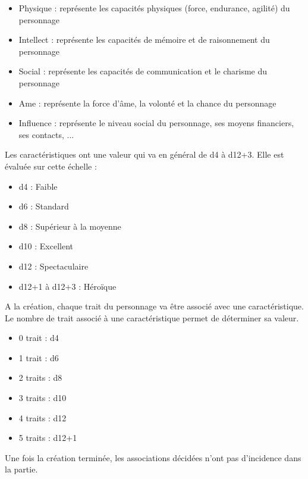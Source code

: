 \begin{multicols}{2}
\begin{itemize}
\item Physique : représente les capacités physiques (force, endurance, agilité) du personnage
\item Intellect : représente les capacités de mémoire et de raisonnement du personnage
\item Social : représente les capacités de communication et le charisme du personnage
\item Ame : représente la force d'âme, la volonté et la chance du personnage
\item Influence : représente le niveau social du personnage, ses moyens financiers, ses contacts, ...
\end{itemize}

Les caractéristiques ont une valeur qui va en général de d4 à d12+3. Elle est évaluée sur cette échelle :

\begin{itemize}
\item d4 : Faible
\item d6 : Standard
\item d8 : Supérieur à la moyenne
\item d10 : Excellent
\item d12 : Spectaculaire
\item d12+1 à d12+3 : Héroïque 
\end{itemize}

A la création, chaque trait du personnage va être associé avec une caractéristique. Le nombre de trait associé à une caractéristique permet de déterminer sa valeur.
 
\begin{itemize}
\item 0 trait : d4
\item 1 trait : d6
\item 2 traits : d8
\item 3 traits : d10
\item 4 traits : d12
\item 5 traits : d12+1
\end{itemize}

Une fois la création terminée, les associations décidées n'ont pas d'incidence dans la partie.

\end{multicols}



